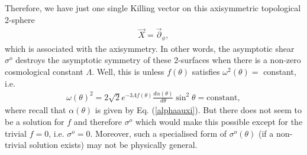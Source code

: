 \documentclass[aps,pre,preprint,superscriptaddress,showpacs,showkeys]{revtex4-1}
\begin{document}
Therefore, we have just one single Killing vector on this axisymmetric topological 2-sphere
\begin{eqnarray}
\vec{X}=\vec{\partial}_\phi,
\end{eqnarray}
which is associated with the axisymmetry. In other words, the asymptotic shear $\sigma^o$ destroys the asymptotic symmetry of these 2-surfaces when there is a non-zero cosmological constant $\Lambda$. Well, this is unless $f(\theta)$ satisfies $\omega^2(\theta)=$ constant, i.e.
\begin{eqnarray}\label{Killingsigma}
\displaystyle\omega(\theta)^2=2\sqrt{2}e^{-3\Lambda f(\theta)}\frac{d\alpha(\theta)}{d\theta}\sin^2{\theta}=\textrm{constant},
\end{eqnarray}
where recall that $\alpha(\theta)$ is given by Eq. (\ref{alphaauxi}). But there does not seem to be a solution for $f$ and therefore $\sigma^o$ which would make this possible except for the trivial $f=0$, i.e. $\sigma^o=0$. Moreover, such a specialised form of $\sigma^o(\theta)$ (if a non-trivial solution exists) may not be physically general.


%


\end{document}

